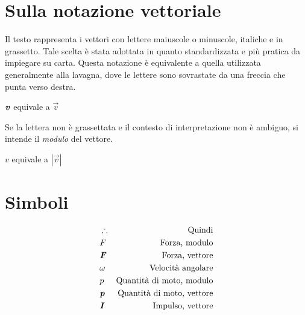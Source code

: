 
\section{Sulla notazione vettoriale}
Il testo rappresenta i vettori con lettere maiuscole o minuscole,
italiche e in grassetto. Tale scelta è stata adottata in quanto
standardizzata e più pratica da impiegare su carta. Questa notazione
è equivalente a quella utilizzata generalmente alla lavagna, dove
le lettere sono sovrastate da una freccia che punta verso destra.

\begin{center}
    $\textbf{\textit{v}}$ equivale a $\vec{v}$
\end{center}

\noindent Se la lettera non è grassettata e il contesto di interpretazione
non è ambiguo, si intende il \textit{modulo} del vettore.

\begin{center}
    $v$ equivale a $|\vec{v}|$
\end{center}


\section{Simboli}

\begin{align*}
    &\therefore  & \text{Quindi}\\
    &F           & \text{Forza, modulo}\\
    &\textbf{\textit{F}} & \text{Forza, vettore}\\
    &\omega      & \text{Velocità angolare}\\
    &p           & \text{Quantità di moto, modulo}\\
    &\textbf{\textit{p}} & \text{Quantità di moto, vettore}\\
    &\textbf{\textit{I}} & \text{Impulso, vettore}
\end{align*}